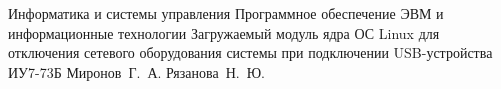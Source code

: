 \documentclass{bmstu}
\begin{document}
\makecourseworktitle
{Информатика и системы управления}
{Программное обеспечение ЭВМ и информационные технологии}
{Загружаемый модуль ядра ОС Linux для отключения сетевого оборудования системы при подключении USB-устройства}
{ИУ7-73Б}
{Миронов~Г.~А.}
{Рязанова~Н.~Ю.}
{}
{}
\setcounter{page}{3}



\maketableofcontents








\makebibliography


\end{document}
